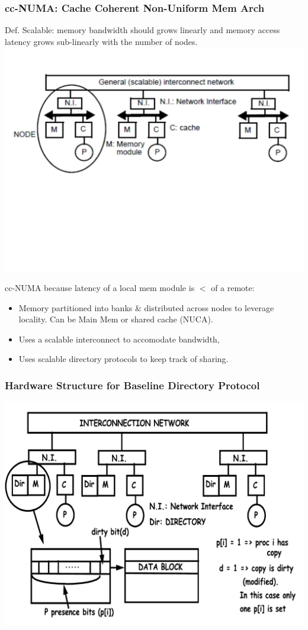 \documentclass{beamer}
\renewcommand{\emph}[1]{\textcolor{structure}{#1}}
\begin{document}
\begin{frame}[fragile,t]
\frametitle{cc-NUMA: Cache Coherent Non-Uniform Mem Arch}

\emph{Def. Scalable: memory bandwidth should grows linearly and
memory access latency grows sub-linearly with the number of nodes}.
\includegraphics[width=59ex]{FigsInfCoherence/MultiNode}
\vspace{-20ex}

\emph{cc-NUMA} because latency of a local mem module is $<$ of a remote:\\
\begin{itemize}
    \item Memory partitioned into banks \& distributed across nodes 
            to leverage locality. Can be Main Mem or shared cache (NUCA).
    \item Uses a scalable interconnect to accomodate bandwidth,
    \item \emph{Uses scalable directory protocols to keep track of sharing.}
\end  {itemize}

\end{frame}

\begin{frame}[fragile,t]
\frametitle{Hardware Structure for Baseline Directory Protocol}

\includegraphics[width=59ex]{FigsInfCoherence/DirBasedProt}

\end{frame}
\end{document}
